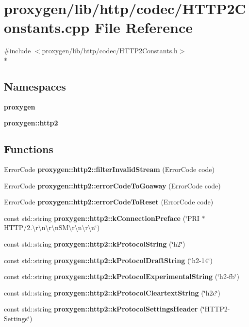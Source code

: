 \section{proxygen/lib/http/codec/\+H\+T\+T\+P2\+Constants.cpp File Reference}
\label{HTTP2Constants_8cpp}
{\ttfamily \#include $<$proxygen/lib/http/codec/\+H\+T\+T\+P2\+Constants.\+h$>$}\\*
\subsection*{Namespaces}
\begin{DoxyCompactItemize}
\item 
 {\bf proxygen}
\item 
 {\bf proxygen\+::http2}
\end{DoxyCompactItemize}
\subsection*{Functions}
\begin{DoxyCompactItemize}
\item 
Error\+Code {\bf proxygen\+::http2\+::filter\+Invalid\+Stream} (Error\+Code code)
\item 
Error\+Code {\bf proxygen\+::http2\+::error\+Code\+To\+Goaway} (Error\+Code code)
\item 
Error\+Code {\bf proxygen\+::http2\+::error\+Code\+To\+Reset} (Error\+Code code)
\item 
const std\+::string {\bf proxygen\+::http2\+::k\+Connection\+Preface} (\char`\"{}P\+RI $\ast$ H\+T\+TP/2.\textbackslash{}r\textbackslash{}n\textbackslash{}r\textbackslash{}n\+S\+M\textbackslash{}r\textbackslash{}n\textbackslash{}r\textbackslash{}n\char`\"{})
\item 
const std\+::string {\bf proxygen\+::http2\+::k\+Protocol\+String} (\char`\"{}h2\char`\"{})
\item 
const std\+::string {\bf proxygen\+::http2\+::k\+Protocol\+Draft\+String} (\char`\"{}h2-\/14\char`\"{})
\item 
const std\+::string {\bf proxygen\+::http2\+::k\+Protocol\+Experimental\+String} (\char`\"{}h2-\/fb\char`\"{})
\item 
const std\+::string {\bf proxygen\+::http2\+::k\+Protocol\+Cleartext\+String} (\char`\"{}h2c\char`\"{})
\item 
const std\+::string {\bf proxygen\+::http2\+::k\+Protocol\+Settings\+Header} (\char`\"{}H\+T\+T\+P2-\/Settings\char`\"{})
\end{DoxyCompactItemize}
